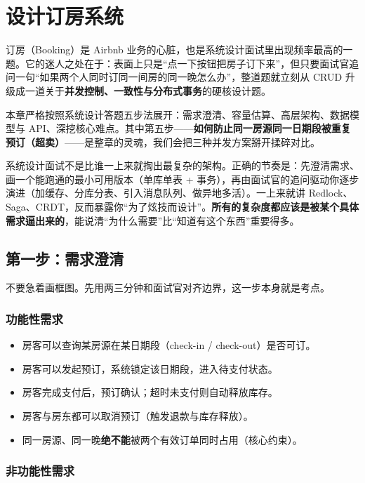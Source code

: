 \chapter{设计订房系统}

订房（Booking）是 Airbnb 业务的心脏，也是系统设计面试里出现频率最高的一题。它的迷人之处在于：表面上只是“点一下按钮把房子订下来”，但只要面试官追问一句“如果两个人同时订同一间房的同一晚怎么办”，整道题就立刻从 CRUD 升级成一道关于\textbf{并发控制、一致性与分布式事务}的硬核设计题。

本章严格按照系统设计答题五步法展开：需求澄清、容量估算、高层架构、数据模型与 API、深挖核心难点。其中第五步——\textbf{如何防止同一房源同一日期段被重复预订（超卖）}——是整章的灵魂，我们会把三种并发方案掰开揉碎对比。

\begin{idea}
系统设计面试不是比谁一上来就掏出最复杂的架构。正确的节奏是：先澄清需求、画一个能跑通的最小可用版本（单库单表 + 事务），再由面试官的追问驱动你逐步演进（加缓存、分库分表、引入消息队列、做异地多活）。一上来就讲 Redlock、Saga、CRDT，反而暴露你“为了炫技而设计”。\textbf{所有的复杂度都应该是被某个具体需求逼出来的}，能说清“为什么需要”比“知道有这个东西”重要得多。
\end{idea}

\section{第一步：需求澄清}

不要急着画框图。先用两三分钟和面试官对齐边界，这一步本身就是考点。

\subsection{功能性需求}

\begin{itemize}
  \item 房客可以查询某房源在某日期段（check-in / check-out）是否可订。
  \item 房客可以发起预订，系统锁定该日期段，进入待支付状态。
  \item 房客完成支付后，预订确认；超时未支付则自动释放库存。
  \item 房客与房东都可以取消预订（触发退款与库存释放）。
  \item 同一房源、同一晚\textbf{绝不能}被两个有效订单同时占用（核心约束）。
\end{itemize}

\subsection{非功能性需求}

